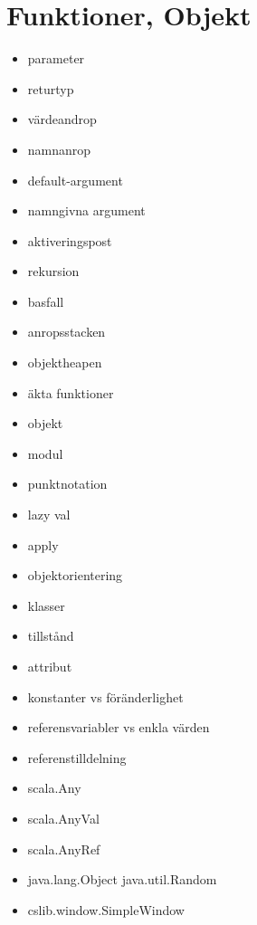 \chapter{Funktioner, Objekt}\label{chapter:W03}
\begin{itemize}[nosep]
\item parameter
\item returtyp
\item värdeandrop
\item namnanrop
\item default-argument
\item namngivna argument
\item aktiveringspost
\item rekursion
\item basfall
\item anropsstacken
\item objektheapen
\item äkta funktioner
\item objekt
\item modul
\item punktnotation
\item lazy val
\item apply
\item objektorientering
\item klasser
\item tillstånd
\item attribut
\item konstanter vs föränderlighet
\item referensvariabler vs enkla värden
\item referenstilldelning
\item scala.Any
\item scala.AnyVal
\item scala.AnyRef
\item java.lang.Object java.util.Random
\item cslib.window.SimpleWindow
\end{itemize}